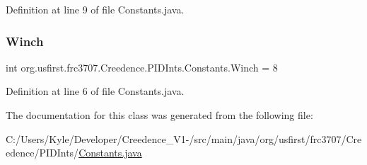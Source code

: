 Definition at line 9 of file Constants.\+java.

\mbox{\label{classorg_1_1usfirst_1_1frc3707_1_1_creedence_1_1_p_i_d_ints_1_1_constants_aebf614887880e7e619372057fa6770c0}} 
\subsubsection{\texorpdfstring{Winch}{Winch}}
{\footnotesize\ttfamily int org.\+usfirst.\+frc3707.\+Creedence.\+P\+I\+D\+Ints.\+Constants.\+Winch = 8\hspace{0.3cm}{\ttfamily [static]}}



Definition at line 6 of file Constants.\+java.



The documentation for this class was generated from the following file\+:\begin{DoxyCompactItemize}
\item 
C\+:/\+Users/\+Kyle/\+Developer/\+Creedence\+\_\+\+V1-\//src/main/java/org/usfirst/frc3707/\+Creedence/\+P\+I\+D\+Ints/\mbox{\hyperlink{_constants_8java}{Constants.\+java}}\end{DoxyCompactItemize}
